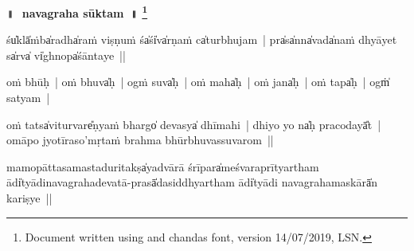 \documentclass[parskip, DIV=14]{scrartcl}
\renewcommand{\thefootnote}{\fnsymbol{footnote}} %
\begin{document}

\vspace{-1.5cm}

\begin{center}
\textbf{{\Huge॥\,~navagraha sūktam~॥  \LARGE\let\thefootnote\relax\footnote{\color{lightgray} Document written using \XeLaTeX{} and chandas font,  version 14/07/2019, LSN.}}}
\end{center}
\Large

śu̍klā̍ṁba̍radha̍raṁ vi॒ṣṇuṁ śa̍śi̍va̍rṇaṁ ca̍turbhu॒ja॒m~|
pra̍sa̍nna̍vada̍naṁ dhyā॒॒yet sa̍rva̍ vi̍ghnopa̍śānta॒ye॒~||


oṁ bhūḥ~| oṁ bhuva̍ḥ~| ogṁ॒ suva̍ḥ~| oṁ maha̍ḥ~| oṁ jana̍ḥ~| oṁ tapa̍ḥ~| ogṁ̍ sa॒tyam~|

oṁ tatsa̍vi॒turvare̎ṇya॒ṁ bhargo̍ de॒vasya̍ dhīmahi~|
dhiyo॒ yo na̍ḥ praco॒dayā̎t~| omāpo॒ jyotī॒raso॒'mṛta॒ṁ brahma॒ bhūrbhuva॒ssuva॒rom~||


\vspace{0.5cm}


mamopāttasamastaduritakṣa̍yadvā॒rā śrīpara̍meśvaraprītyartham ādi̍tyādinavagrahadevatā-prasā̍dasiddhyartham ādi̍tyādi navagrahamaskārā̍n kari॒ṣye~||




\end{document}
